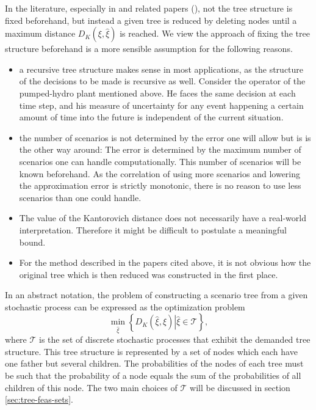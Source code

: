 In the literature, especially in \cite{Heitsch2009} and related papers (\cite{Dupacova2003,Heitsch2003,Heitsch2009a,Heitsch2010}), not the tree structure is fixed beforehand, but instead a given tree is reduced by deleting nodes until a maximum distance $D_K(\xi,\hat{\xi})$ is reached.
We view the approach of fixing the tree structure beforehand is a more sensible assumption for the following reasons.
\begin{itemize}
\item a recursive tree structure makes sense in most applications, as the structure of the decisions to be made is recursive as well. Consider the operator of the pumped-hydro plant mentioned above. He faces the same decision at each time step, and his measure of uncertainty for any event happening a certain amount of time into the future is independent of the current situation.
\item the number of scenarios is not determined by the error one will allow but is is the other way around: The error is determined by the maximum number of scenarios one can handle computationally. This number of scenarios will be known beforehand. As the correlation of using more scenarios and lowering the approximation error is strictly monotonic, there is no reason to use less scenarios than one could handle.
\item The value of the Kantorovich distance does not necessarily have a real-world interpretation. Therefore it might be difficult to postulate a meaningful bound.
\item For the method described in the papers cited above, it is not obvious how the original tree which is then reduced was constructed in the first place.
\end{itemize}

In an abstract notation, the problem of constructing a scenario tree from a given stochastic process can be expressed as the optimization problem
\begin{equation}
  \label{eq:symbolic-optimization-problem}
  \min_{\hat{\xi}}\left\{D_K(\hat{\xi}, \xi)\left|\hat{\xi} \in \mathcal{T}\right.\right\},
\end{equation}
where $\mathcal{T}$ is the set of discrete stochastic processes that exhibit the demanded tree structure.
This tree structure is represented by a set of nodes which each have one father but several children.
The probabilities of the nodes of each tree must be such that the probability of a node equals the sum of the probabilities of all children of this node. The two main choices of $\mathcal{T}$ will be discussed in section \ref{sec:tree-feas-sets}.

